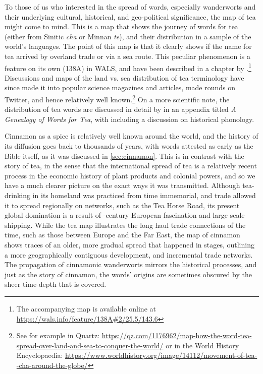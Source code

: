 To those of us who interested in the spread of words, especially \glspl{wanderwort} and their underlying cultural, historical, and geo-political significance, the map of tea might come to mind. This is a map that shows the journey of words for tea (either from Sinitic \textit{cha} or Minnan \textit{te}), and their distribution in a sample of the world's languages. The point of this map is that it clearly shows if the name for tea arrived by overland trade or via a sea route. This peculiar phenomenon is a feature on its own (138A) in \gls{WALS}, and have been described in a chapter by \textcite{dahl_tea_2013}.\footnote{The accompanying map is available online at \url{https://wals.info/feature/138A\#2/25.5/143.6}} Discussions and maps of the land vs. sea distribution of tea terminology have since made it into popular science magazines and articles, made rounds on Twitter, and hence relatively well known.\footnote{See for example \textcite{sonnad_tea_2018} in Quartz: \url{https://qz.com/1176962/map-how-the-word-tea-spread-over-land-and-sea-to-conquer-the-world/} or \textcite{netchev_movement_2022} in the World History Encyclopaedia: \url{https://www.worldhistory.org/image/14112/movement-of-tea--cha-around-the-globe/}} On a more scientific note, the distribution of tea words are discussed in detail by \parencite[261-270]{mair_true_2009} in an appendix titled \textit{A Genealogy of Words for Tea}, with including a discussion on historical phonology.

Cinnamon as a spice is relatively well known around the world, and the history of its diffusion goes back to thousands of years, with words attested as early as the Bible itself, as it was discussed in \cref{sec:cinnamon}. This is in contrast with the story of tea, in the sense that the international spread of tea is a relatively recent process in the economic history of plant products and colonial powers, and so we have a much clearer picture on the exact ways it was transmitted. Although tea-drinking in its homeland was practiced from time immemorial, and trade allowed it to spread regionally on networks, such as the Tea Horse Road, its present global domination is a result of -century European fascination and large scale shipping. While the tea map illustrates the long haul trade connections of the time, such as those between Europe and the Far East, the map of cinnamon shows traces of an older, more gradual spread that happened in stages, outlining a more geographically contiguous development, and incremental trade networks. The propagation of cinnamonic \glspl{wanderwort} mirrors the historical processes, and just as the story of cinnamon, the words' origins are sometimes obscured by the sheer time-depth that is covered.

